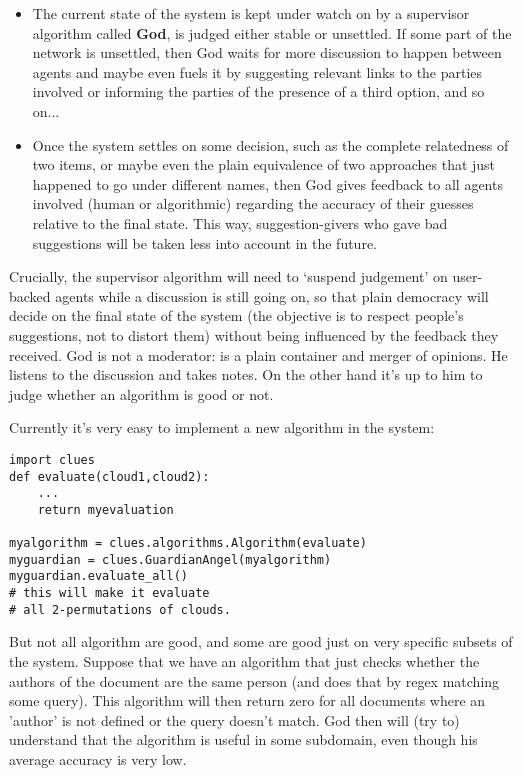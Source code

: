 \documentclass[11pt]{article}
\begin{document}
\begin{itemize}
\item The current state of the system is kept under watch on by a supervisor algorithm called {\bf God}, is judged either stable or unsettled. If some part of the network is unsettled, then God waits for more discussion to happen between agents and maybe even fuels it by suggesting relevant links to the parties involved or informing the parties of the presence of a third option, and so on...
\item Once the system settles on some decision, such as the complete relatedness of two items, or maybe even the plain equivalence of two approaches that just happened to go under different names, then God gives feedback to all agents involved (human or algorithmic) regarding the accuracy of their guesses relative to the final state. This way, suggestion-givers who gave bad suggestions will be taken less into account in the future.
\end{itemize}

Crucially, the supervisor algorithm will need to `suspend judgement' on user-backed agents while a discussion is still going on, so that plain democracy will decide on the final state of the system (the objective is to respect people's suggestions, not to distort them) without being influenced by the feedback they received. God is not a moderator: is a plain container and merger of opinions. He listens to the discussion and takes notes. On the other hand it's up to him to judge whether an algorithm is good or not.

Currently it's very easy to implement a new algorithm in the system:

\begin{lstlisting}
import clues
def evaluate(cloud1,cloud2):
	...
	return myevaluation

myalgorithm = clues.algorithms.Algorithm(evaluate)
myguardian = clues.GuardianAngel(myalgorithm)
myguardian.evaluate_all() 
# this will make it evaluate
# all 2-permutations of clouds.
\end{lstlisting}

But not all algorithm are good, and some are good just on very specific subsets of the system. Suppose that we have an algorithm that just checks whether the authors of the document are the same person (and does that by regex matching some query). This algorithm will then return zero for all documents where an 'author' is not defined or the query doesn't match. God then will (try to) understand that the algorithm is useful in some subdomain, even though his average accuracy is very low.
\end{document}
